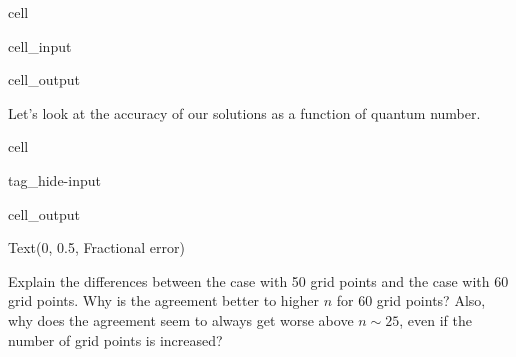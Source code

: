 \documentclass[letterpaper,10pt,english]{jupyterBook}
\begin{document}
\begin{sphinxuseclass}{cell}\begin{sphinxVerbatimInput}

\begin{sphinxuseclass}{cell_input}
\begin{sphinxVerbatim}[commandchars=\\\{\}]
\PYG{p}{[}\PYG{p}{]}
\end{sphinxVerbatim}

\end{sphinxuseclass}\end{sphinxVerbatimInput}
\begin{sphinxVerbatimOutput}

\begin{sphinxuseclass}{cell_output}
\begin{sphinxVerbatim}
\end{sphinxVerbatim}

\noindent{}

\end{sphinxuseclass}\end{sphinxVerbatimOutput}

\end{sphinxuseclass}
\sphinxAtStartPar
Let’s look at the accuracy of our solutions as a function of quantum number.

\begin{sphinxuseclass}{cell}
\begin{sphinxuseclass}{tag_hide-input}\begin{sphinxVerbatimOutput}

\begin{sphinxuseclass}{cell_output}
\begin{sphinxVerbatim}[commandchars=\\\{\}]
Text(0, 0.5, \PYGZsq{}Fractional error\PYGZsq{})
\end{sphinxVerbatim}

\noindent{}

\end{sphinxuseclass}\end{sphinxVerbatimOutput}

\end{sphinxuseclass}
\end{sphinxuseclass}
\sphinxAtStartPar
{} Explain the differences between the case with 50 grid points and the case with 60 grid points. Why is the agreement better to higher \(n\) for 60 grid points? Also, why does the agreement seem to always get worse above \(n \sim 25\), even if the number of grid points is increased?
\end{document}
